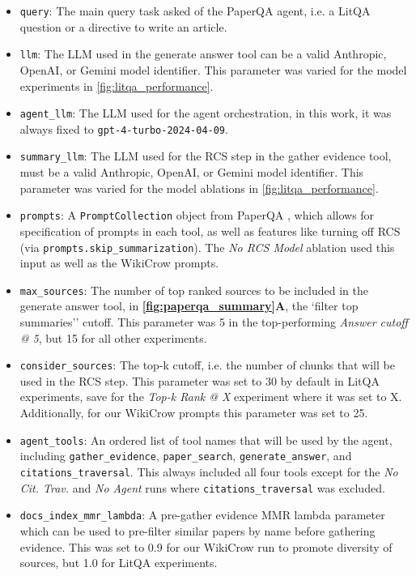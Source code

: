 \documentclass{article}
\begin{document}
\begin{itemize}
\item \texttt{query}: The main query task asked of the PaperQA agent, i.e. a LitQA question or a directive to write an article. 
\item \texttt{llm}: The LLM used in the generate answer tool can be a valid Anthropic, OpenAI, or Gemini model identifier. This parameter was varied for the model experiments in \autoref{fig:litqa_performance}.
\item \texttt{agent\_llm}: The LLM used for the agent orchestration, in this work, it was always fixed to \texttt{gpt-4-turbo-2024-04-09}.
\item \texttt{summary\_llm}: The LLM used for the RCS step in the gather evidence tool, must be a valid Anthropic, OpenAI, or Gemini model identifier. This parameter was varied for the model ablations in \autoref{fig:litqa_performance}.
\item \texttt{prompts}: A \texttt{PromptCollection} object from PaperQA \cite{lala2023paperqa}, which allows for specification of prompts in each tool, as well as features like turning off RCS (via \texttt{prompts.skip\_summarization}). The \textit{No RCS Model} ablation used this input as well as the WikiCrow prompts.
\item \texttt{max\_sources}: The number of top ranked sources to be included in the generate answer tool, in \textbf{\autoref{fig:paperqa_summary}A}, the `filter top summaries'' cutoff. This parameter was 5 in the top-performing \textit{Answer cutoff @ 5}, but 15 for all other experiments.
\item \texttt{consider\_sources}: The top-k cutoff, i.e. the number of chunks that will be used in the RCS step. This parameter was set to 30 by default in LitQA experiments, save for the \textit{Top-k Rank @ X} experiment where it was set to X. Additionally, for our WikiCrow prompts this parameter was set to 25. 
\item \texttt{agent\_tools}: An ordered list of tool names that will be used by the agent, including \texttt{gather\_evidence}, \texttt{paper\_search}, \texttt{generate\_answer}, and \texttt{citations\_traversal}. This always included all four tools except for the \textit{No Cit. Trav.} and \textit{No Agent} runs where \texttt{citations\_traversal} was excluded.
\item \texttt{docs\_index\_mmr\_lambda}: A pre-gather evidence MMR lambda parameter which can be used to pre-filter similar papers by name before gathering evidence. This was set to 0.9 for our WikiCrow run to promote diversity of sources, but 1.0 for LitQA experiments. 

\end{itemize}
\end{document}
